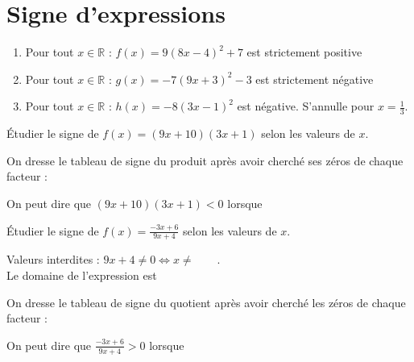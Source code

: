 \documentclass[main.tex]{subfiles}
\begin{document}
\section{Signe d'expressions}
\begin{example} \hfill 
	
\begin{enumerate}[label=\arabic*),leftmargin=*]
	\item Pour tout $x\in\mathbb{R}$ : $f(x)=9(8x-4)^2+7$ est strictement positive
	\item Pour tout $x\in\mathbb{R}$ : $g(x)=-7(9x+3)^2-3$ est strictement négative
	\item Pour tout $x\in\mathbb{R}$ : $h(x)=-8(3x-1)^2$ est négative. S'annulle pour $x=\frac{1}{3}$.
\end{enumerate} 
\end{example}
\begin{example} Étudier le signe de $f(x)=(9x+10)(3x+1)$ selon les valeurs de $x$.\medskip
	 
	\noindent	On dresse le tableau de signe du produit après avoir cherché ses zéros de chaque facteur :
	
	\noindent\hfill  	{} 
	
	On peut dire que $(9x+10)(3x+1)<0$ lorsque \dotfill 
\end{example}
\begin{example} Étudier le signe de $f(x)=\frac{-3x+6}{9x+4}$ selon les valeurs de $x$.\medskip
	
	\noindent	Valeurs interdites : $9x+4\neq 0 \iff x\neq \qquad$. \\
	
	\noindent Le domaine de l'expression est\dotfill
	  
	\noindent	On dresse le tableau de signe du quotient après avoir cherché les zéros de chaque facteur :
	
	\noindent\hfill  	{} 

On peut dire que $\frac{-3x+6}{9x+4}>0$ lorsque \dotfill 
\end{example}
\end{document}

